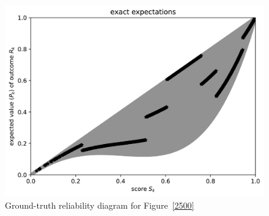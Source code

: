 \documentclass{article}
\begin{document}
\begin{figure}
\begin{centering}

\parbox{\imsize}{\includegraphics[width=\imsize]
                {./codes/unweighted/50000_2500_10_1/exact.jpg}}

\end{centering}
\caption{Ground-truth reliability diagram for Figure~\ref{2500}}
\label{2500e}
\end{figure}
\end{document}
